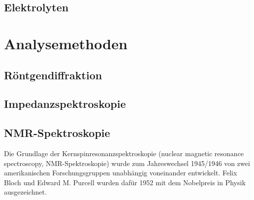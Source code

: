\documentclass[a4paper, 11pt, headsepline,footsepline,twoside,abstract]{scrbook}
\begin{document}
\subsection{Elektrolyten}
\section{Analysemethoden}
\subsection{Röntgendiffraktion}
\subsection{Impedanzspektroskopie}
\subsection{NMR-Spektroskopie}
Die Grundlage der Kernspinresonanzspektroskopie (nuclear magnetic resonance spectroscopy, NMR-Spektroskopie) wurde zum Jahreswechsel 1945/1946 von zwei amerikanischen Forschungsgruppen unabhängig voneinander entwickelt. Felix Bloch und Edward M. Purcell wurden dafür 1952 mit dem Nobelpreis in Physik ausgezeichnet.
\\\\
\end{document}
